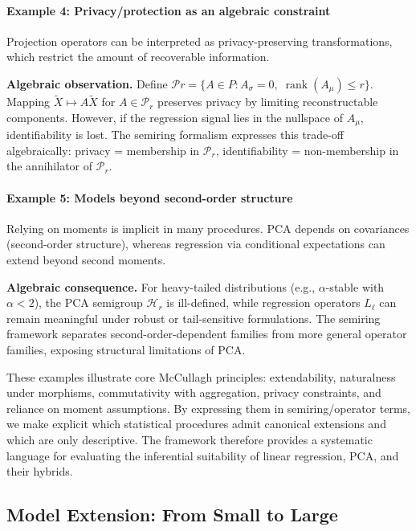 \paragraph{Example 4: Privacy/protection as an algebraic constraint}

Projection operators can be interpreted as privacy-preserving transformations, which restrict the amount of recoverable information.

\textbf{Algebraic observation.}
Define $\mathcal{P}r = \{ A \in P : A_\sigma = 0, \; \operatorname{rank}(A_\mu) \le r \}.$
Mapping $\tilde X \mapsto A \tilde X$ for $A \in \mathcal{P}_r$ preserves privacy by limiting reconstructable components. However, if the regression signal lies in the nullspace of $A_\mu$, identifiability is lost. The semiring formalism expresses this trade-off algebraically: privacy = membership in $\mathcal{P}_r$, identifiability = non-membership in the annihilator of $\mathcal{P}_r$.

\paragraph{Example 5: Models beyond second-order structure}

Relying on moments is implicit in many procedures. PCA depends on covariances (second-order structure), whereas regression via conditional expectations can extend beyond second moments.

\textbf{Algebraic consequence.}
For heavy-tailed distributions (e.g., $\alpha$-stable with $\alpha < 2$), the PCA semigroup $\mathcal{H}_r$ is ill-defined, while regression operators $L_\ell$ can remain meaningful under robust or tail-sensitive formulations. The semiring framework separates second-order-dependent families from more general operator families, exposing structural limitations of PCA.

These examples illustrate core McCullagh principles: extendability, naturalness under morphisms, commutativity with aggregation, privacy constraints, and reliance on moment assumptions. By expressing them in semiring/operator terms, we make explicit which statistical procedures admit canonical extensions and which are only descriptive. The framework therefore provides a systematic language for evaluating the inferential suitability of linear regression, PCA, and their hybrids.


\subsection{Model Extension: From Small to Large}

